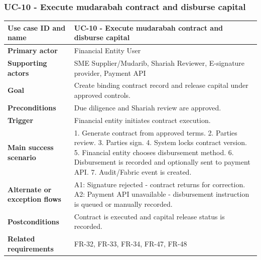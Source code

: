 \documentclass[11pt,a4paper]{article}
\begin{document}
\subsubsection{UC-10 - Execute mudarabah contract and disburse capital}
\begin{footnotesize}
\begin{longtable}{@{}p{}p{}@{}}
\rowcolor{gray!10}\textbf{Use case ID and name} & UC-10 - Execute mudarabah contract and disburse capital \\ \hline
\rowcolor{gray!10}\textbf{Primary actor} & Financial Entity User \\ \hline
\rowcolor{gray!10}\textbf{Supporting actors} & SME Supplier/Mudarib, Shariah Reviewer, E-signature provider, Payment API \\ \hline
\rowcolor{gray!10}\textbf{Goal} & Create binding contract record and release capital under approved controls. \\ \hline
\rowcolor{gray!10}\textbf{Preconditions} & Due diligence and Shariah review are approved. \\ \hline
\rowcolor{gray!10}\textbf{Trigger} & Financial entity initiates contract execution. \\ \hline
\rowcolor{gray!10}\textbf{Main success scenario} & 1. Generate contract from approved terms. 2. Parties review. 3. Parties sign. 4. System locks contract version. 5. Financial entity chooses disbursement method. 6. Disbursement is recorded and optionally sent to payment API. 7. Audit/Fabric event is created. \\ \hline
\rowcolor{gray!10}\textbf{Alternate or exception flows} & A1: Signature rejected - contract returns for correction. A2: Payment API unavailable - disbursement instruction is queued or manually recorded. \\ \hline
\rowcolor{gray!10}\textbf{Postconditions} & Contract is executed and capital release status is recorded. \\ \hline
\rowcolor{gray!10}\textbf{Related requirements} & FR-32, FR-33, FR-34, FR-47, FR-48 \\ \hline
\end{longtable}
\end{footnotesize}
\end{document}
